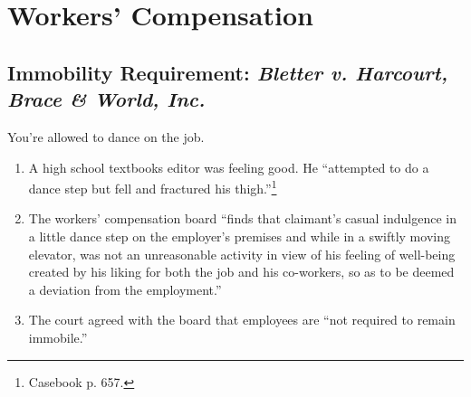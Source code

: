 \section{Workers' Compensation}

\subsection{Immobility Requirement: \emph{Bletter v. Harcourt, Brace \& World, 
Inc.}}

You're allowed to dance on the job.

\begin{enumerate}
    \item A high school textbooks editor was feeling good. He ``attempted to 
    do a dance step but fell and fractured his thigh.''\footnote{Casebook p.  
    657.}
    \item The workers' compensation board ``finds that claimant's casual 
    indulgence in a little dance step on the employer's premises and while in 
    a swiftly moving elevator, was not an unreasonable activity in view of his 
    feeling of well-being created by his liking for both the job and his 
    co-workers, so as to be deemed a deviation from the employment.''
    \item The court agreed with the board that employees are ``not required to 
    remain immobile.''
\end{enumerate}


